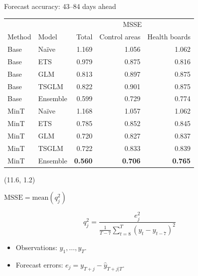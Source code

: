 \documentclass[
  14pt,
  ignorenonframetext,
  aspectratio=169,
]{beamer}
\begin{document}
\begin{frame}{Forecast accuracy: 43--84 days ahead}
\label{forecast-accuracy-4384-days-ahead}
\fontsize{10}{12}\sf

\begin{tabular}[t]{llrrr}
\toprule
\multicolumn{2}{c}{ } & \multicolumn{3}{c}{MSSE} \\
\cmidrule(l{3pt}r{3pt}){3-5}
Method & Model & Total & Control areas & Health boards\\
\midrule
Base & Naïve & 1.169 & 1.056 & 1.062\\
Base & ETS & 0.979 & 0.875 & 0.816\\
Base & GLM & 0.813 & 0.897 & 0.875\\
Base & TSGLM & 0.822 & 0.901 & 0.875\\
Base & Ensemble & 0.599 & 0.729 & 0.774\\
\addlinespace
MinT & Naïve & 1.168 & 1.057 & 1.062\\
MinT & ETS & 0.785 & 0.852 & 0.845\\
MinT & GLM & 0.720 & 0.827 & 0.837\\
MinT & TSGLM & 0.722 & 0.833 & 0.839\\
MinT & Ensemble & \textbf{0.560} & \textbf{0.706} & \textbf{0.765}\\
\bottomrule
\end{tabular}

\begin{textblock}{4.2}(11.6, 1.2)
\begin{block}{}
\centerline{$\text{MSSE} = \text{mean}(q_{j}^2)$}
$$
  q^2_{j} = \frac{ e^2_{j}}
 {\displaystyle\frac{1}{T-7}\sum_{t=8}^T (y_{t}-y_{t-7})^2}
$$
\begin{itemize}
\item Observations: $y_1,\dots,y_T$.
\item Forecast errors: $e_{j}=y_{T+j}-\hat{y}_{T+j|T}$.
\end{itemize}
\end{block}
\end{textblock}
\end{frame}
\end{document}
